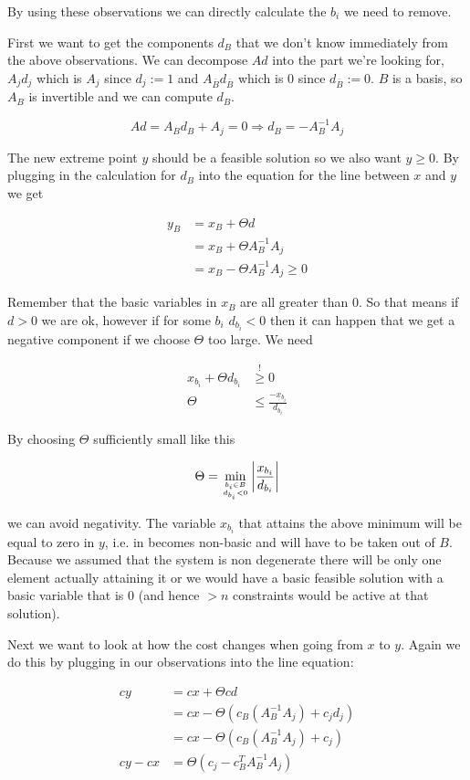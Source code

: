 By using these observations we can directly calculate the $b_i$ we need to remove.

First we want to get the components $d_B$ that we don't know immediately from the above observations. We can decompose $Ad$ into the part we're looking for, $A_j d_j$ which is $A_j$ since $d_j:=1$ and $A_{\bar B} d_{\bar B}$ which is 0 since $d_{\bar B}:=0$. $B$ is a basis, so $A_B$ is invertible and we can compute $d_B$.

\[Ad = A_B d_B+A_j = 0 \Rightarrow d_B = -A^{-1}_B A_j\]

The new extreme point $y$ should be a feasible solution so we also want $y\geq 0$. By plugging in the calculation for $d_B$ into the equation for the line between $x$ and $y$ we get

\begin{align*}
y_B &= x_B + \Theta d\\
 &= x_B + \Theta A_B^{-1} A_j\\
 &= x_B - \Theta A_B^{-1} A_j \geq 0
\end{align*}

Remember that the basic variables in $x_B$ are all greater than 0. So that means if $d>0$ we are ok, however if for some $b_i$ $d_{b_i} <0$ then it can happen that we get a negative component if we choose $\Theta$ too large. We need 

\begin{align*}
x_{b_i} +\Theta d_{b_i} &\stackrel{!}{\geq} 0\\
\Theta &\leq \frac{-x_{b_i}}{d_{b_i}}
\end{align*}

By choosing $\Theta$ sufficiently small like this

\[\Theta = \min_{{b_i\in B}\atop {d_{b_i} <0}} \left| \frac{x_{b_i}}{d_{b_i}}\right |\]

we can avoid negativity. The variable $x_{b_i}$ that attains the above minimum will be equal to zero in $y$, i.e. in becomes non-basic and will have to be taken out of $B$. Because we assumed that the system is non degenerate there will be only one element actually attaining it or we would have a basic feasible solution with a basic variable that is 0 (and hence $>n$ constraints would be active at that solution). 

Next we want to look at how the cost changes when going from $x$ to $y$. Again we do this by plugging in our observations into the line equation:

\begin{align*}
cy &= cx + \Theta cd\\
    &= cx - \Theta (c_B(A_B^{-1} A_j) + c_jd_j)\\
    &= cx - \Theta (c_B(A_B^{-1} A_j) + c_j)\\
cy - cx &= \Theta (c_j - c_B^{T}A_B^{-1}A_j)
\end{align*}

